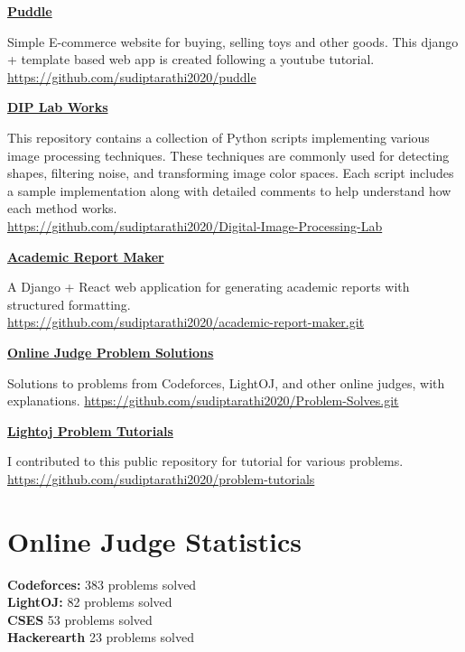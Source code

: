 \documentclass[a4paper,10pt]{article}
\begin{document}
\href{https://github.com/sudiptarathi2020/puddle}{\textbf{Puddle}}
\begin{boxB}
    Simple E-commerce website for buying, selling toys and other goods. This django + template based web app is created following a youtube tutorial.\\  \href{https://github.com/sudiptarathi2020/puddle}{https://github.com/sudiptarathi2020/puddle}
\end{boxB}

\href{https://github.com/sudiptarathi2020/Digital-Image-Processing-Lab}{\textbf{DIP Lab Works}}
\begin{boxB}
    This repository contains a collection of Python scripts implementing various image processing techniques. These techniques are commonly used for detecting shapes, filtering noise, and transforming image color spaces. Each script includes a sample implementation along with detailed comments to help understand how each method works.\\ \href{https://github.com/sudiptarathi2020/Digital-Image-Processing-Lab}{https://github.com/sudiptarathi2020/Digital-Image-Processing-Lab}
\end{boxB}

\href{https://github.com/sudiptarathi2020/academic-report-maker.git}{\textbf{Academic Report Maker}}
\begin{boxB}
    A Django + React web application for generating academic reports with structured formatting.\\  \href{https://github.com/sudiptarathi2020/academic-report-maker.git}{https://github.com/sudiptarathi2020/academic-report-maker.git}
\end{boxB}

\href{https://github.com/sudiptarathi2020/Problem-Solves.git}{\textbf{Online Judge Problem Solutions}}
\begin{boxB}
    Solutions to problems from Codeforces, LightOJ, and other online judges, with explanations.  \href{https://github.com/sudiptarathi2020/Problem-Solves.git}{https://github.com/sudiptarathi2020/Problem-Solves.git}
\end{boxB}

\href{https://github.com/sudiptarathi2020/problem-tutorials}{\textbf{Lightoj Problem Tutorials}}
\begin{boxB}
    I contributed to this public repository for tutorial for various problems.  \href{https://github.com/sudiptarathi2020/problem-tutorials}{https://github.com/sudiptarathi2020/problem-tutorials}
\end{boxB}



\section*{Online Judge Statistics}
\begin{multicols}{2}
\textbf{Codeforces:} 383 problems solved \\
\textbf{LightOJ:} 82 problems solved \\
\textbf{CSES} 53 problems solved \\
\textbf{Hackerearth} 23 problems solved
\end{multicols}
\end{document}
